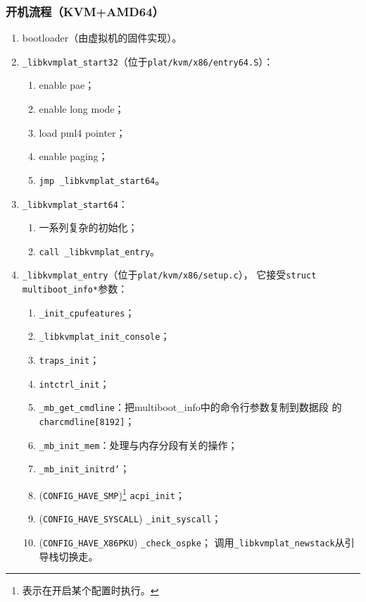 \documentclass{../runikraft-report}
\begin{document}
\subsubsection[开机流程]{开机流程（KVM+AMD64）}
\begin{enumerate}
\item bootloader（由虚拟机的固件实现）。
\item \texttt{\_libkvmplat\_start32}（位于\texttt{plat/kvm/x86/entry64.S}）：
    \begin{enumerate}
    \item enable pae；
    \item enable long mode；
    \item load pml4 pointer；
    \item enable paging；
    \item \texttt{jmp \_libkvmplat\_start64}。
    \end{enumerate}
\item \texttt{\_libkvmplat\_start64}：
    \begin{enumerate}
    \item 一系列复杂的初始化；
    \item \texttt{call \_libkvmplat\_entry}。
    \end{enumerate}
\item \texttt{\_libkvmplat\_entry}（位于\texttt{plat/kvm/x86/setup.c}），
它接受\texttt{struct multiboot\_info*}参数：
    \begin{enumerate}
    \item \texttt{\_init\_cpufeatures}；
    \item \texttt{\_libkvmplat\_init\_console}；
    \item \texttt{traps\_init}；
    \item \texttt{intctrl\_init}；
    \item \texttt{\_mb\_get\_cmdline}：把multiboot\_info中的命令行参数复制到数据段
    的\texttt{char\linebreak cmdline[8192]}；
    \item \texttt{\_mb\_init\_mem}：处理与内存分段有关的操作；
    \item \texttt{\_mb\_init\_initrd`}；
    \item (\texttt{CONFIG\_HAVE\_SMP})\footnote{表示在开启某个配置时执行。} \texttt{acpi\_init}；
    \item (\texttt{CONFIG\_HAVE\_SYSCALL}) \texttt{\_init\_syscall}；
    \item (\texttt{CONFIG\_HAVE\_X86PKU}) \texttt{\_check\_ospke}；
    调用\texttt{\_libkvmplat\_newstack}从引导栈切换走。

\end{enumerate}
\end{enumerate}
\end{document}
